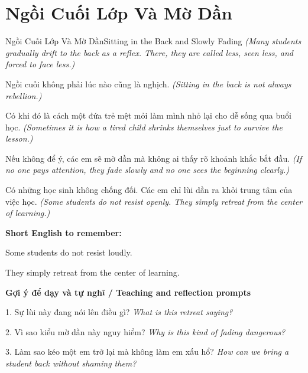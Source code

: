 \section{Ngồi Cuối Lớp Và Mờ Dần}
\begin{truyen}{Ngồi Cuối Lớp Và Mờ Dần}{Sitting in the Back and Slowly Fading}
\textit{(Many students gradually drift to the back as a reflex. There, they are called less, seen less, and forced to face less.)}

Ngồi cuối không phải lúc nào cũng là nghịch.
\textit{(Sitting in the back is not always rebellion.)}

Có khi đó là cách một đứa trẻ mệt mỏi làm mình nhỏ lại cho dễ sống qua buổi học.
\textit{(Sometimes it is how a tired child shrinks themselves just to survive the lesson.)}

Nếu không để ý, các em sẽ mờ dần mà không ai thấy rõ khoảnh khắc bắt đầu.
\textit{(If no one pays attention, they fade slowly and no one sees the beginning clearly.)}

\end{truyen}

\begin{baihoc}
Có những học sinh không chống đối. Các em chỉ lùi dần ra khỏi trung tâm của việc học.
\textit{(Some students do not resist openly. They simply retreat from the center of learning.)}
\end{baihoc}

\begin{ghinhoanh}
\textbf{Short English to remember:}

Some students do not resist loudly.

They simply retreat from the center of learning.

\end{ghinhoanh}

\begin{tuhocnhanh}
\textbf{Gợi ý để dạy và tự nghĩ / Teaching and reflection prompts}

1. Sự lùi này đang nói lên điều gì? \textit{What is this retreat saying?}

2. Vì sao kiểu mờ dần này nguy hiểm? \textit{Why is this kind of fading dangerous?}

3. Làm sao kéo một em trở lại mà không làm em xấu hổ? \textit{How can we bring a student back without shaming them?}
\end{tuhocnhanh}
\ngancach

